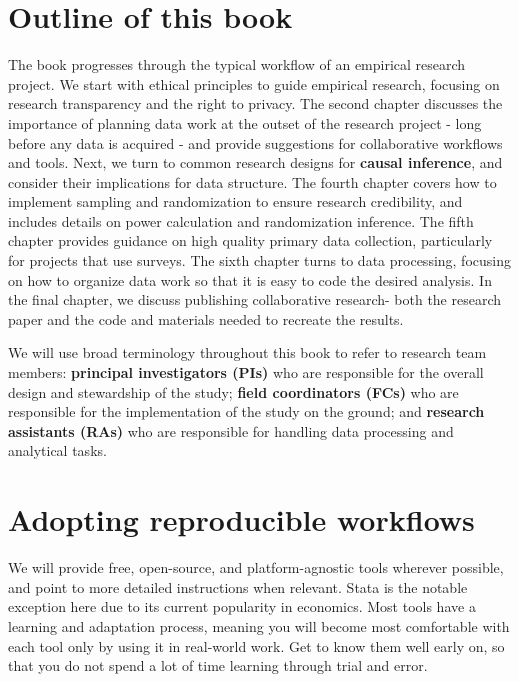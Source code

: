 \section{Outline of this book}
The book progresses through the typical workflow of an empirical research project.
We start with ethical principles to guide empirical research, 
focusing on research transparency and the right to privacy. 
The second chapter discusses the importance of planning data work at the outset of the research project - 
long before any data is acquired - and provide suggestions for collaborative workflows and tools. 
Next, we turn to common research designs for 
\textbf{causal inference}{}, and consider their implications for data structure. 
The fourth chapter covers how to implement sampling and randomization to ensure research credibility, 
and includes details on power calculation and randomization inference. 
The fifth chapter provides guidance on high quality primary data collection, particularly for projects that use surveys. 
The sixth chapter turns to data processing, 
focusing on how to organize data work so that it is easy to code the desired analysis. 
In the final chapter, we discuss publishing collaborative research- 
both the research paper and the code and materials needed to recreate the results.  

We will use broad terminology throughout this book to refer to research team members:
\textbf{principal investigators (PIs)} who are responsible for
the overall design and stewardship of the study;
\textbf{field coordinators (FCs)} who are responsible for
the implementation of the study on the ground;
and \textbf{research assistants (RAs)} who are responsible for
handling data processing and analytical tasks.


\section{Adopting reproducible workflows}
We will provide free, open-source, and platform-agnostic tools wherever possible,
and point to more detailed instructions when relevant.
Stata is the notable exception here due to its current popularity in economics.
Most tools have a learning and adaptation process,
meaning you will become most comfortable with each tool
only by using it in real-world work.
Get to know them well early on,
so that you do not spend a lot of time learning through trial and error.

